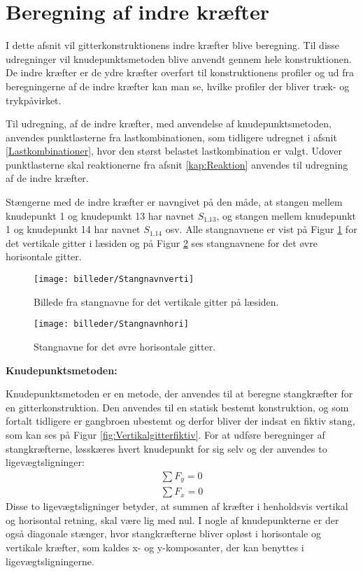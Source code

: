 \section{Beregning af indre kræfter}
I dette afsnit vil gitterkonstruktionens indre kræfter blive beregning. Til disse udregninger vil knudepunktsmetoden blive anvendt gennem hele konstruktionen. De indre kræfter er de ydre kræfter overført til konstruktionens profiler og ud fra beregningerne af de indre kræfter kan man se, hvilke profiler der bliver træk- og trykpåvirket. 

Til  udregning, af de indre kræfter, med anvendelse af knudepunktsmetoden, anvendes punktlasterne fra lastkombinationen, som tidligere udregnet i afsnit \ref{Lastkombinationer}, hvor den størst belastet lastkombination er valgt. Udover punktlasterne skal reaktionerne fra afsnit \ref{kap:Reaktion} anvendes til udregning af de indre kræfter.

Stængerne med de indre kræfter er navngivet på den måde, at stangen mellem knudepunkt 1 og knudepunkt 13 har navnet $S_{1.13}$, og stangen mellem knudepunkt 1 og knudepunkt 14 har navnet $S_{1.14}$ osv. Alle stangnavnene er vist på Figur \ref{fig:Stangnavnverti} for det vertikale gitter i læsiden og på Figur \ref{fig:Stangnavnhori} ses stangnavnene for det øvre horisontale gitter.
\begin{figure}[htbp] \centering
\texttt{[image: billeder/Stangnavnverti]} 
\caption{Billede fra stangnavne for det vertikale gitter på læsiden.}
\label{fig:Stangnavnverti}
\end{figure}

\begin{figure}[htbp] \centering
\texttt{[image: billeder/Stangnavnhori]} 
\caption{Stangnavne for det øvre horisontale gitter.}
\label{fig:Stangnavnhori}
\end{figure}

\textbf{Knudepunktsmetoden:}

Knudepunktsmetoden er en metode, der anvendes til at beregne stangkræfter for en gitterkonstruktion. Den anvendes til en statisk bestemt konstruktion, og som fortalt tidligere er gangbroen ubestemt og derfor bliver der indsat en fiktiv stang, som kan ses på Figur \ref{fig:Vertikalgitterfiktiv}. For at udføre beregninger af stangkræfterne, løsskæres hvert knudepunkt for sig selv og der anvendes to ligevægtsligninger:
\begin{align*}
\sum F_{y} = 0 \\ \sum F_{x} = 0
\end{align*}
Disse to ligevægtsligninger betyder, at summen af kræfter i henholdsvis vertikal og horisontal retning, skal være lig med nul. I nogle af knudepunkterne er der også diagonale stænger, hvor stangkræfterne bliver opløst i horisontale og vertikale kræfter, som kaldes x- og y-komposanter, der kan benyttes i ligevægtsligningerne.

